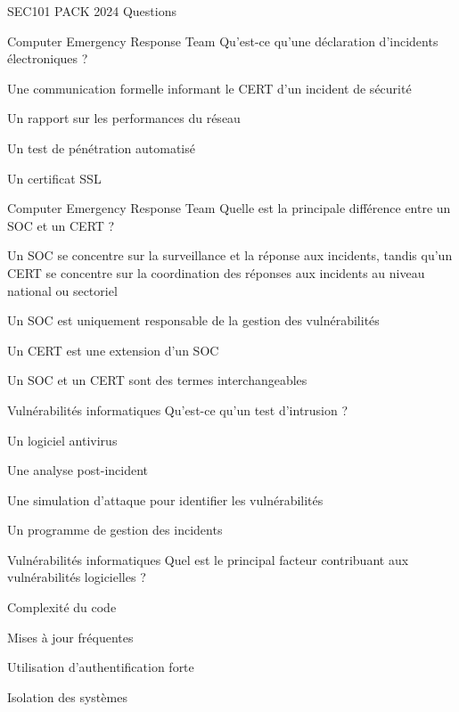 \documentclass[12pt]{article}
\begin{document}
\begin{quiz}{SEC101 PACK 2024 Questions}
     \begin{multi}[points=1]{Computer Emergency Response Team}
     Qu'est-ce qu'une déclaration d'incidents électroniques ?
        \item *Une communication formelle informant le CERT d'un incident de sécurité
        \item Un rapport sur les performances du réseau
        \item Un test de pénétration automatisé
        \item Un certificat SSL
      \end{multi} 
    
     \begin{multi}[points=1]{Computer Emergency Response Team}
     Quelle est la principale différence entre un SOC et un CERT ?
        \item *Un SOC se concentre sur la surveillance et la réponse aux incidents, tandis qu'un CERT se concentre sur la coordination des réponses aux incidents au niveau national ou sectoriel
        \item Un SOC est uniquement responsable de la gestion des vulnérabilités
        \item Un CERT est une extension d'un SOC
        \item Un SOC et un CERT sont des termes interchangeables
      \end{multi} 
    


\begin{multi}[points=1]{Vulnérabilités informatiques}
Qu'est-ce qu'un test d'intrusion ?
    \item Un logiciel antivirus
    \item Une analyse post-incident
    \item *Une simulation d'attaque pour identifier les vulnérabilités
    \item Un programme de gestion des incidents
\end{multi}

\begin{multi}[points=1]{Vulnérabilités informatiques}
Quel est le principal facteur contribuant aux vulnérabilités logicielles ?
    \item *Complexité du code
    \item Mises à jour fréquentes
    \item Utilisation d'authentification forte
    \item Isolation des systèmes
\end{multi}


\end{quiz}
\end{document}

